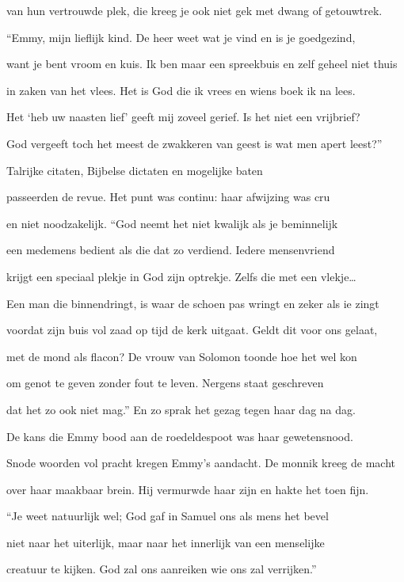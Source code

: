 van hun vertrouwde plek,
die kreeg je ook niet gek
met dwang of getouwtrek.

“Emmy, mijn lieflijk kind.
De heer weet wat je vind
en is je goedgezind,

want je bent vroom en kuis.
Ik ben maar een spreekbuis
en zelf geheel niet thuis

in zaken van het vlees.
Het is God die ik vrees
en wiens boek ik na lees.

Het ‘heb uw naasten lief’
geeft mij zoveel gerief.
Is het niet een vrijbrief?

God vergeeft toch het meest
de zwakkeren van geest
is wat men apert leest?”

Talrijke citaten,
Bijbelse dictaten
en mogelijke baten

passeerden de revue.
Het punt was continu:
haar afwijzing was cru

en niet noodzakelijk.
“God neemt het niet kwalijk
als je beminnelijk

een medemens bedient
als die dat zo verdiend.
Iedere mensenvriend

krijgt een speciaal plekje
in God zijn optrekje.
Zelfs die met een vlekje…

Een man die binnendringt,
is waar de schoen pas wringt
en zeker als ie zingt

voordat zijn buis vol zaad
op tijd de kerk uitgaat.
Geldt dit voor ons gelaat,

met de mond als flacon?
De vrouw van Solomon
toonde hoe het wel kon

om genot te geven
zonder fout te leven.
Nergens staat geschreven

dat het zo ook niet mag.”
En zo sprak het gezag
tegen haar dag na dag.

De kans die Emmy bood
aan de roedeldespoot
was haar gewetensnood.

Snode woorden vol pracht
kregen Emmy’s aandacht.
De monnik kreeg de macht

over haar maakbaar brein.
Hij vermurwde haar zijn
en hakte het toen fijn.

“Je weet natuurlijk wel;
God gaf in Samuel
ons als mens het bevel

niet naar het uiterlijk,
maar naar het innerlijk
van een menselijke

creatuur te kijken.
God zal ons aanreiken
wie ons zal verrijken.”
